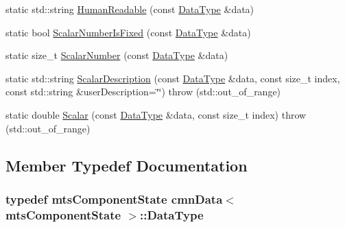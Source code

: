 \begin{DoxyCompactItemize}
\item 
static std\-::string \hyperlink{classcmn_data_3_01mts_component_state_01_4_a60915bde58ad96fe5dfa473aa34d2fc8}{Human\-Readable} (const \hyperlink{classcmn_data_3_01mts_component_state_01_4_a1f90216f34afbed70f7dbd34d33fafde}{Data\-Type} \&data)
\item 
static bool \hyperlink{classcmn_data_3_01mts_component_state_01_4_a1ada527fb863278e5694cffbd7489be8}{Scalar\-Number\-Is\-Fixed} (const \hyperlink{classcmn_data_3_01mts_component_state_01_4_a1f90216f34afbed70f7dbd34d33fafde}{Data\-Type} \&data)
\item 
static size\-\_\-t \hyperlink{classcmn_data_3_01mts_component_state_01_4_a594a12a65ef7e47e0a2a023a4616bf0f}{Scalar\-Number} (const \hyperlink{classcmn_data_3_01mts_component_state_01_4_a1f90216f34afbed70f7dbd34d33fafde}{Data\-Type} \&data)
\item 
static std\-::string \hyperlink{classcmn_data_3_01mts_component_state_01_4_ac5e262aeec4702218e4a2952e2d6c297}{Scalar\-Description} (const \hyperlink{classcmn_data_3_01mts_component_state_01_4_a1f90216f34afbed70f7dbd34d33fafde}{Data\-Type} \&data, const size\-\_\-t index, const std\-::string \&user\-Description=\char`\"{}\char`\"{})  throw (std\-::out\-\_\-of\-\_\-range)
\item 
static double \hyperlink{classcmn_data_3_01mts_component_state_01_4_a8b5ca82082004e09989650f8693f9fac}{Scalar} (const \hyperlink{classcmn_data_3_01mts_component_state_01_4_a1f90216f34afbed70f7dbd34d33fafde}{Data\-Type} \&data, const size\-\_\-t index)  throw (std\-::out\-\_\-of\-\_\-range)
\end{DoxyCompactItemize}


\subsection{Member Typedef Documentation}
\hypertarget{classcmn_data_3_01mts_component_state_01_4_a1f90216f34afbed70f7dbd34d33fafde}{
\subsubsection[{Data\-Type}]{\setlength{\rightskip}{0pt plus 5cm}typedef {\bf mts\-Component\-State} {\bf cmn\-Data}$<$ {\bf mts\-Component\-State} $>$\-::{\bf Data\-Type}}}\label{classcmn_data_3_01mts_component_state_01_4_a1f90216f34afbed70f7dbd34d33fafde}


